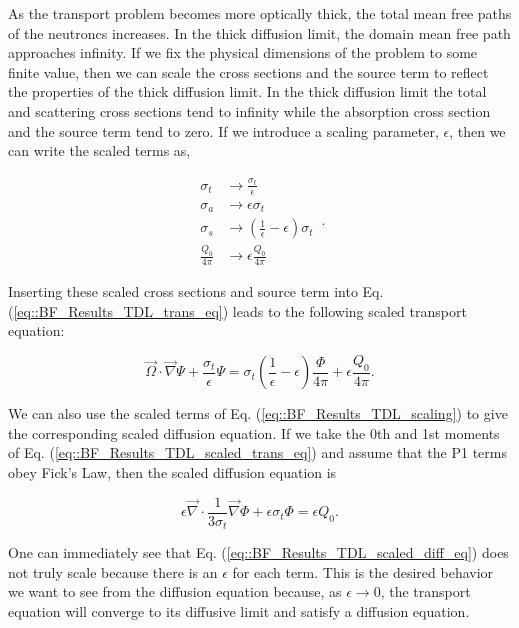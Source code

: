 \noindent As the transport problem becomes more optically thick, the total mean free paths of the neutroncs increases. In the thick diffusion limit, the domain mean free path approaches infinity. If we fix the physical dimensions of the problem to some finite value, then we can scale the cross sections and the source term to reflect the properties of the thick diffusion limit. In the thick diffusion limit the total and scattering cross sections tend to infinity while the absorption cross section and the source term tend to zero. If we introduce a scaling parameter, $\epsilon$, then we can write the scaled terms as,

\begin{equation}
\label{eq::BF_Results_TDL_scaling}
\begin{aligned}
	\sigma_t &\rightarrow \frac{\sigma_t}{\epsilon} \\
	\sigma_a &\rightarrow \epsilon \sigma_t\\
	\sigma_s &\rightarrow \left( \frac{1}{\epsilon} - \epsilon   \right) \sigma_t \\
	\frac{Q_0}{4 \pi} &\rightarrow \epsilon \frac{Q_0}{4 \pi}
\end{aligned} \, .
\end{equation}

\noindent Inserting these scaled cross sections and source term into Eq. (\ref{eq::BF_Results_TDL_trans_eq}) leads to the following scaled transport equation:

\begin{equation}
\label{eq::BF_Results_TDL_scaled_trans_eq}
\vec{\Omega} \cdot \vec{\nabla} \Psi + \frac{\sigma_t}{\epsilon} \Psi = \sigma_t \left( \frac{1}{\epsilon} - \epsilon   \right)  \frac{\Phi}{4 \pi} + \epsilon \frac{Q_0}{4 \pi} .
\end{equation}

\noindent We can also use the scaled terms of Eq. (\ref{eq::BF_Results_TDL_scaling}) to give the corresponding scaled diffusion equation. If we take the 0th and 1st moments of Eq. (\ref{eq::BF_Results_TDL_scaled_trans_eq}) and assume that the P1 terms obey Fick's Law, then the scaled diffusion equation is

\begin{equation}
\label{eq::BF_Results_TDL_scaled_diff_eq}
\epsilon \vec{\nabla} \cdot \frac{1}{3 \sigma_t}  \vec{\nabla} \Phi + \epsilon \sigma_t \Phi =  \epsilon Q_0.
\end{equation}

\noindent One can immediately see that Eq. (\ref{eq::BF_Results_TDL_scaled_diff_eq}) does not truly scale because there is an $\epsilon$ for each term. This is the desired behavior we want to see from the diffusion equation because, as $\epsilon \rightarrow 0$, the transport equation will converge to its diffusive limit and satisfy a diffusion equation.

